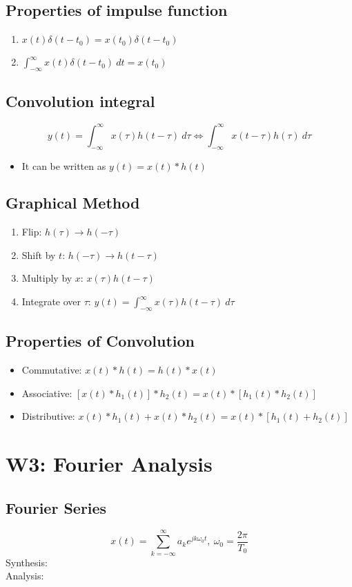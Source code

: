 \documentclass[a4paper]{article}
\begin{document}
\subsection{Properties of impulse function}
\begin{enumerate}
    \item $x(t)\delta(t-t_0) = x(t_0)\delta(t-t_0)$
    \item $\displaystyle\int_{-\infty}^{\infty} x(t)\delta(t-t_0)\ dt = x(t_0)$
\end{enumerate}
\subsection{Convolution integral}
$$y(t) = \int_{-\infty}^{\infty}x(\tau)h(t-\tau)\ d\tau\Longleftrightarrow\int_{-\infty}^{\infty}x(t-\tau)h(\tau)\ d\tau$$
\begin{itemize}
    \item It can be written as $y(t) = x(t)*h(t)$
\end{itemize}
\subsection{Graphical Method}
\begin{enumerate}
    \item Flip: $h(\tau)\rightarrow h(-\tau)$
    \item Shift by $t$: $h(-\tau)\rightarrow h(t-\tau)$
    \item Multiply by $x$: $x(\tau)h(t-\tau)$
    \item Integrate over $\tau$: $\displaystyle y(t) = \int_{-\infty}^{\infty}x(\tau)h(t-\tau)\ d\tau$
\end{enumerate}
\subsection{Properties of Convolution}
\begin{itemize}
    \item Commutative: $x(t)*h(t) = h(t)*x(t)$
    \item Associative: $[x(t)*h_1(t)]*h_2(t) = x(t)*[h_1(t)*h_2(t)]$
    \item Distributive: $x(t)*h_1(t)+x(t)*h_2(t) = x(t)*[h_1(t)+h_2(t)]$
\end{itemize}
\newpage
\section{W3: Fourier Analysis}
\subsection{Fourier Series}
$$x(t) = \sum_{k=-\infty}^{\infty}a_k e^{jk\omega_0 t},\ \omega_0 = \frac{2\pi}{T_0}$$
Synthesis: \\
Analysis: 
\end{document}
